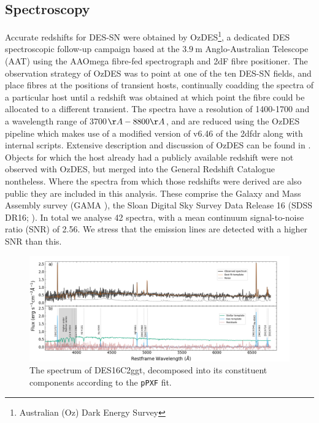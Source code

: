 \documentclass[fleqn,usenatbib,]{mnras}
\begin{document}
\subsection{Spectroscopy \label{subsec:spec}}
Accurate redshifts for DES-SN were obtained by OzDES\footnote{Australian (Oz) Dark Energy Survey}, a dedicated DES spectroscopic follow-up campaign based at the $3.9~\textrm{m}$ Anglo-Australian Telescope (AAT) using the AAOmega fibre-fed spectrograph and 2dF fibre positioner. The observation strategy of OzDES was to point at one of the ten DES-SN fields, and place fibres at the positions of transient hosts, continually coadding the spectra of a particular host until a redshift was obtained at which point the fibre could be allocated to a different transient. The spectra have a resolution of 1400-1700 and a wavelength range of 3700$\AA - 8800\AA$, and are reduced using the OzDES pipeline which makes use of a modified version of v6.46 of the 2dfdr \citep{Croom2004} along with internal scripts. Extensive description and discussion of OzDES can be found in \citet{Yuan2015,Childress2017,Lidman2020}.
Objects for which the host already had a publicly available redshift were not observed with OzDES, but merged into the General Redshift Catalogue nontheless. Where the spectra from which those redshifts were derived are also public they are included in this analysis. These comprise the Galaxy and Mass Assembly survey (GAMA \citealt{Driver2009,Baldry2018}), the Sloan Digital Sky Survey Data Release 16 (SDSS DR16; \citealt{York2000,Ahumada2019}). In total we analyse 42 spectra, with a mean continuum signal-to-noise ratio (SNR) of 2.56. We stress that the emission lines are detected with a higher SNR than this.

\begin{figure}
\includegraphics[width=\textwidth]{figs/gal_spec.png}
\caption{The spectrum of DES16C2ggt, decomposed into its constituent components according to the \texttt{pPXF} fit. 
\label{fig:host_spec}}
\end{figure}
\end{document}
